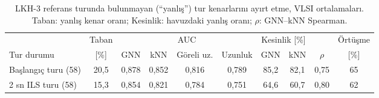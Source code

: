 \begin{table}[!htbp]
\centering\small\setlength{\tabcolsep}{2.5pt}
\caption{LKH-3 referans turunda bulunmayan (``yanlış'') tur kenarlarını ayırt etme, VLSI ortalamaları. Taban: yanlış kenar oranı; Kesinlik: havuzdaki yanlış oranı; $\rho$: GNN--kNN Spearman.}
\label{tab:v2-mechanism}
\begin{tabular*}{\textwidth}{@{\extracolsep{\fill}}lccccccccc}
\toprule
 & Taban & \multicolumn{4}{c}{AUC} & \multicolumn{2}{c}{Kesinlik [\%]} & & Örtüşme \\
\cmidrule(lr){3-6}\cmidrule(lr){7-8}
Tur durumu & [\%] & GNN & kNN & Göreli uz. & Uzunluk & GNN & kNN & $\rho$ & [\%] \\
\midrule
Başlangıç turu (58) & 20{,}5 & 0{,}878 & 0{,}852 & 0{,}816 & 0{,}789 & 85{,}2 & 82{,}1 & 0{,}75 & 65 \\
2 sn ILS turu (58) & 15{,}3 & 0{,}854 & 0{,}821 & 0{,}784 & 0{,}751 & 64{,}6 & 60{,}7 & 0{,}80 & 62 \\
\bottomrule
\end{tabular*}
\end{table}
